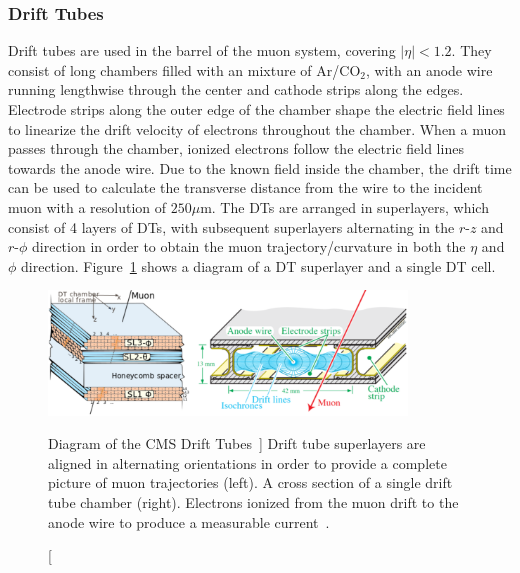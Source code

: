 \subsubsection{Drift Tubes} \label{sec:CMS_DT}
Drift tubes are used in the barrel of the muon system, covering $\left|\eta\right| < 1.2$. They consist of long chambers filled with an mixture of Ar/$\text{CO}_2$, with an anode wire running lengthwise through the center and cathode strips along the edges. Electrode strips along the outer edge of the chamber shape the electric field lines to linearize the drift velocity of electrons throughout the chamber. When a muon passes through the chamber, ionized electrons follow the electric field lines towards the anode wire. Due to the known field inside the chamber, the drift time can be used to calculate the transverse distance from the wire to the incident muon with a resolution of $250\unit{\mu\m}$. The DTs are arranged in superlayers, which consist of 4 layers of DTs, with subsequent superlayers alternating in the $r$-$z$ and $r$-$\phi$ direction in order to obtain the muon trajectory/curvature in both the $\eta$ and $\phi$ direction. Figure~\ref{fig:DT} shows a diagram of a DT superlayer and a single DT cell.

\begin{figure}[htpb]
	\centering
	\includegraphics[width=0.85\textwidth]{figs/03_experiment/CMS_DT.png}
	\caption
	[Diagram of the CMS Drift Tubes~\cite{CMSDT}]
	{Drift tube superlayers are aligned in alternating orientations in order to provide a complete picture of muon trajectories (left). A cross section of a single drift tube chamber (right). Electrons ionized from the muon drift to the anode wire to produce a measurable current~\cite{CMSDT}.}
	\label{fig:DT}
\end{figure}

